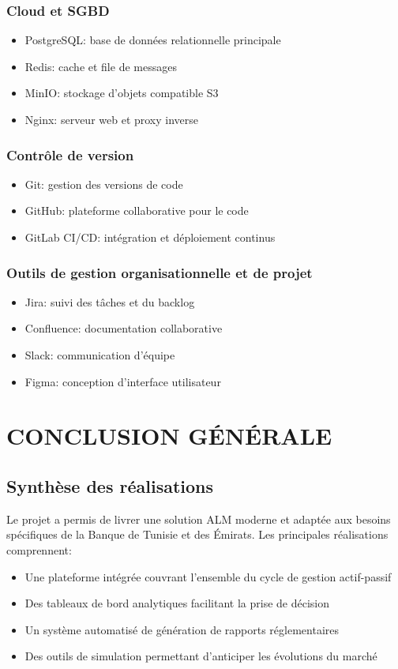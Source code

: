 \documentclass[12pt,a4paper]{report}
\begin{document}
\subsection{Cloud et SGBD}
\begin{itemize}
    \item PostgreSQL: base de données relationnelle principale
    \item Redis: cache et file de messages
    \item MinIO: stockage d'objets compatible S3
    \item Nginx: serveur web et proxy inverse
\end{itemize}

\subsection{Contrôle de version}
\begin{itemize}
    \item Git: gestion des versions de code
    \item GitHub: plateforme collaborative pour le code
    \item GitLab CI/CD: intégration et déploiement continus
\end{itemize}

\subsection{Outils de gestion organisationnelle et de projet}
\begin{itemize}
    \item Jira: suivi des tâches et du backlog
    \item Confluence: documentation collaborative
    \item Slack: communication d'équipe
    \item Figma: conception d'interface utilisateur
\end{itemize}

\chapter{CONCLUSION GÉNÉRALE}

\section*{Synthèse des réalisations}
Le projet a permis de livrer une solution ALM moderne et adaptée aux besoins spécifiques de la Banque de Tunisie et des Émirats. Les principales réalisations comprennent:
\begin{itemize}
    \item Une plateforme intégrée couvrant l'ensemble du cycle de gestion actif-passif
    \item Des tableaux de bord analytiques facilitant la prise de décision
    \item Un système automatisé de génération de rapports réglementaires
    \item Des outils de simulation permettant d'anticiper les évolutions du marché
\end{itemize}
\end{document}
